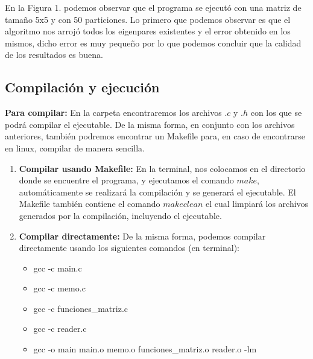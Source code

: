 \documentclass[12pt]{article}
\begin{document}
\begin{figure}[H]
	\centering
	\hfill
\end{figure}

En la Figura 1. podemos observar que el programa se ejecutó con una matriz de tamaño 5x5 y con 50 particiones. Lo primero que podemos observar es que el algoritmo nos arrojó todos los eigenpares existentes y el error obtenido en los mismos, dicho error es muy pequeño por lo que podemos concluir que la calidad de los resultados es buena.

\subsection{Compilación y ejecución}
\textbf{Para compilar:} En la carpeta encontraremos los archivos $.c$ y $.h$ con los que se podrá compilar el ejecutable. De la misma forma, en conjunto con los archivos anteriores, también podremos encontrar un Makefile para, en caso de encontrarse en linux, compilar de manera sencilla.

\begin{enumerate}
	\item \textbf{Compilar usando Makefile:} En la terminal, nos colocamos en el directorio donde se encuentre el programa, y ejecutamos el comando $make$, automáticamente se realizará la compilación y se generará el ejecutable. El Makefile también contiene el comando $make clean$ el cual limpiará los archivos generados por la compilación, incluyendo el ejecutable.
	\item \textbf{Compilar directamente:} De la misma forma, podemos compilar directamente usando los siguientes comandos (en terminal):
	\begin{itemize}
		\item gcc -c main.c
		\item gcc -c memo.c
		\item gcc -c funciones\_matriz.c
		\item gcc -c reader.c
		\item gcc -o main main.o memo.o funciones\_matriz.o reader.o -lm
	\end{itemize}
\end{enumerate}
\end{document}
